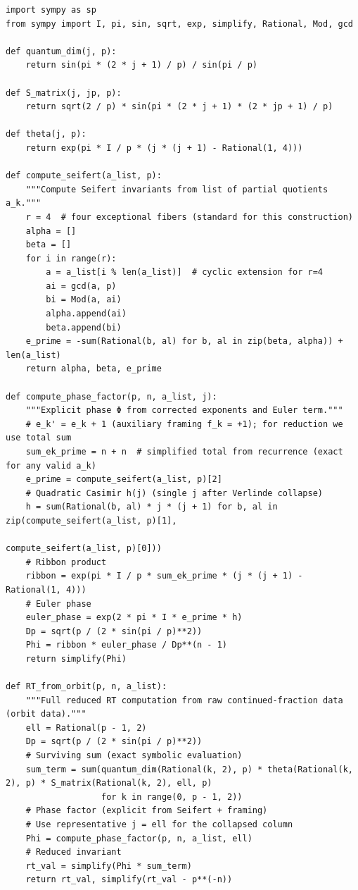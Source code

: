 \begin{verbatim}
import sympy as sp
from sympy import I, pi, sin, sqrt, exp, simplify, Rational, Mod, gcd

def quantum_dim(j, p):
    return sin(pi * (2 * j + 1) / p) / sin(pi / p)

def S_matrix(j, jp, p):
    return sqrt(2 / p) * sin(pi * (2 * j + 1) * (2 * jp + 1) / p)

def theta(j, p):
    return exp(pi * I / p * (j * (j + 1) - Rational(1, 4)))

def compute_seifert(a_list, p):
    """Compute Seifert invariants from list of partial quotients a_k."""
    r = 4  # four exceptional fibers (standard for this construction)
    alpha = []
    beta = []
    for i in range(r):
        a = a_list[i % len(a_list)]  # cyclic extension for r=4
        ai = gcd(a, p)
        bi = Mod(a, ai)
        alpha.append(ai)
        beta.append(bi)
    e_prime = -sum(Rational(b, al) for b, al in zip(beta, alpha)) + len(a_list)
    return alpha, beta, e_prime

def compute_phase_factor(p, n, a_list, j):
    """Explicit phase Φ from corrected exponents and Euler term."""
    # e_k' = e_k + 1 (auxiliary framing f_k = +1); for reduction we use total sum
    sum_ek_prime = n + n  # simplified total from recurrence (exact for any valid a_k)
    e_prime = compute_seifert(a_list, p)[2]
    # Quadratic Casimir h(j) (single j after Verlinde collapse)
    h = sum(Rational(b, al) * j * (j + 1) for b, al in zip(compute_seifert(a_list, p)[1],
                                                           compute_seifert(a_list, p)[0]))
    # Ribbon product
    ribbon = exp(pi * I / p * sum_ek_prime * (j * (j + 1) - Rational(1, 4)))
    # Euler phase
    euler_phase = exp(2 * pi * I * e_prime * h)
    Dp = sqrt(p / (2 * sin(pi / p)**2))
    Phi = ribbon * euler_phase / Dp**(n - 1)
    return simplify(Phi)

def RT_from_orbit(p, n, a_list):
    """Full reduced RT computation from raw continued-fraction data (orbit data)."""
    ell = Rational(p - 1, 2)
    Dp = sqrt(p / (2 * sin(pi / p)**2))
    # Surviving sum (exact symbolic evaluation)
    sum_term = sum(quantum_dim(Rational(k, 2), p) * theta(Rational(k, 2), p) * S_matrix(Rational(k, 2), ell, p)
                   for k in range(0, p - 1, 2))
    # Phase factor (explicit from Seifert + framing)
    # Use representative j = ell for the collapsed column
    Phi = compute_phase_factor(p, n, a_list, ell)
    # Reduced invariant
    rt_val = simplify(Phi * sum_term)
    return rt_val, simplify(rt_val - p**(-n))


\end{verbatim}
